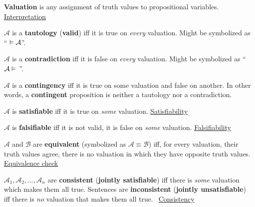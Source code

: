 \documentclass[a4paper,10pt]{article}
\begin{document}
\begin{terms}
    \item \textbf{Valuation} is any assignment of truth values to propositional variables.
    \hfill\href{https://en.wikipedia.org/wiki/Interpretation_(logic)}{Interpretation}

    \item $\mathcal{A}$ is a \textbf{tautology} (\textbf{valid}) iff it is true on \emph{every} valuation. Might be symbolized as \enquote{${} \vDash \mathcal{A}$}.

    \item $\mathcal{A}$ is a \textbf{contradiction} iff it is false on \emph{every} valuation. Might be symbolized as \enquote{\,$\mathcal{A} \vDash {}$\,}.

    \item $\mathcal{A}$ is a \textbf{contingency} iff it is true on some valuation and false on another. In other words, a \textbf{contingent} proposition is neither a tautology nor a contradiction.

    \item $\mathcal{A}$ is \textbf{satisfiable} iff it is true on \emph{some} valuation.
    \hfill\href{https://en.wikipedia.org/wiki/Satisfiability}{Satisfiability}

    \item $\mathcal{A}$ is \textbf{falsifiable} iff it is not valid, \ie it is false on \emph{some} valuation.
    \hfill\href{https://en.wikipedia.org/wiki/Falsifiability}{Falsifiability}

    \item $\mathcal{A}$ and $\mathcal{B}$ are \textbf{equivalent} (symbolized as $\mathcal{A} \equiv \mathcal{B}$) iff, for every valuation, their truth values agree, \ie there is no valuation in which they have opposite truth values.
    \hfill\href{https://en.wikipedia.org/wiki/Formal_equivalence_checking}{Equivalence check}

    \item $\mathcal{A}_1, \mathcal{A}_2, \dotsc, \mathcal{A}_n$ are \textbf{consistent} (\textbf{jointly satisfiable}) iff there is \emph{some} valuation which makes them all true. Sentences are \textbf{inconsistent} (\textbf{jointly unsatisfiable}) iff there is \emph{no} valuation that makes them all true.
    ~\hfill\href{https://en.wikipedia.org/wiki/Consistency}{Consistency}


\end{terms}
\end{document}
